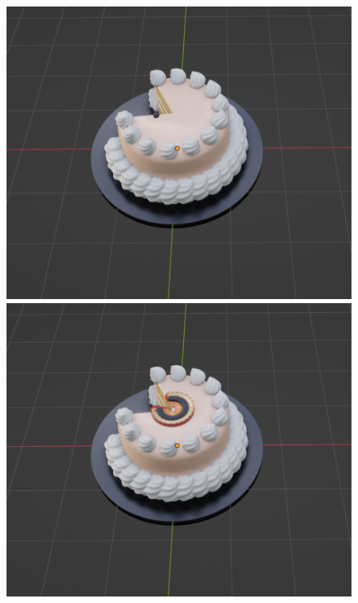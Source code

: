 \begin{figure}[h]
\begin{minipage}[b]{0.48\linewidth}
 \end{minipage}\\
  \begin{minipage}[b]{0.48\linewidth}
  \centering
  \includegraphics[scale=0.25]{./imgs/cakeParamMean/toppingQuanMin.png}
 \end{minipage}
 \begin{minipage}[b]{0.48\linewidth}
  \centering
  \includegraphics[scale=0.25]{./imgs/cakeParamMean/toppingQuanMax.png}

\end{minipage}
\end{figure}
